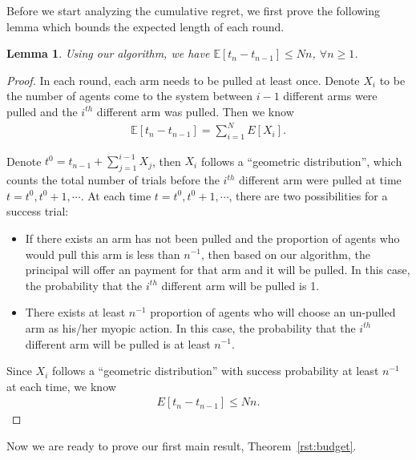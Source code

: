 \documentclass{article}
\newtheorem{lemma}{Lemma}
\begin{document}
Before we start analyzing the cumulative regret, we first prove the following lemma which bounds the expected length of each round.

\begin{lemma}
Using our algorithm, we have $\mathbb{E}[t_{n}-t_{n-1}]\leq Nn$, $\forall n\geq 1$.
\label{round:length}
\end{lemma}


\begin{proof}
In each round, each arm needs to be pulled at least once. Denote $X_{i}$ to be the number of agents come to the system between $i-1$ different arms were pulled and the $i^{th}$ different arm was pulled. Then we know 
\begin{align}
\mathbb{E}[t_{n}-t_{n-1}]=\sum_{i=1}^{N}E[X_{i}]. \nonumber
\end{align}


Denote $t^{0}=t_{n-1}+\sum_{j=1}^{i-1}X_{j}$, then $X_{i}$ follows a ``geometric distribution'', which counts the total number of trials before the $i^{th}$ different arm were pulled at time $t=t^{0},t^{0}+1,\cdots$. At each time $t=t^{0}, t^{0}+1,\cdots$, there are two possibilities for a success trial:
\begin{itemize}
\item If there exists an arm has not been pulled and the proportion of agents who would pull this arm is less than $n^{-1}$, then based on our algorithm, the principal will offer an payment for that arm and it will be pulled. In this case, the probability that the $i^{th}$ different arm will be pulled is 1.  
\item There exists at least $n^{-1}$ proportion of agents who will choose an un-pulled arm as his/her myopic action. In this case, the probability that the $i^{th}$ different arm will be pulled is at least $n^{-1}$.
\end{itemize}

Since $X_{i}$ follows a ``geometric distribution'' with success probability at least $n^{-1}$ at each time, we know 
\begin{align}
E[t_{n}-t_{n-1}]\leq Nn. \nonumber
\end{align}
\end{proof}


Now we are ready to prove our first main result, Theorem~\ref{rst:budget}.
\end{document}
